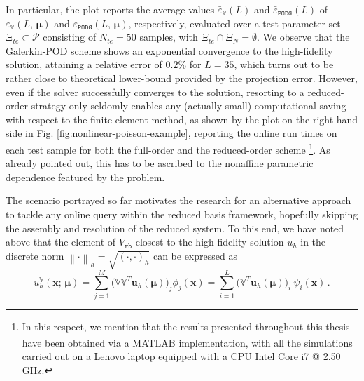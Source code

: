 \documentclass[12pt, a4paper, twoside, openright, notitlepage]{report}
\numberwithin{equation}{chapter}
\theoremstyle{theorem}
\theoremstyle{definition}
\theoremstyle{remark}
\theoremstyle{proposition}
\numberwithin{figure}{chapter}
\newcommand{\norm}[1]{\left\lVert#1\right\rVert}
\newcommand{\bg}[1]{\boldsymbol{#1}}
\begin{document}
		In particular, the plot reports the average values $\bar{\varepsilon}_{\mathbb{V}}^{}(L)$ and $\bar{\varepsilon}_{\texttt{PODG}}^{}(L)$ of $\varepsilon_{\mathbb{V}}(L, \, \bg{\mu})$ and $\varepsilon_{\texttt{PODG}}(L, \, \bg{\mu})$, respectively, evaluated over a test parameter set $\Xi_{te} \subset \mathcal{P}$ consisting of $N_{te} = 50$ samples, with $\Xi_{te} \cap \Xi_N = \emptyset$. We observe that the Galerkin-POD scheme shows an exponential convergence to the high-fidelity solution, attaining a relative error of $0.2 \%$ for $L = 35$, which turns out to be rather close to theoretical lower-bound provided by the projection error. However, even if the solver successfully converges to the solution, resorting to a reduced-order strategy only seldomly enables any (actually small) computational saving with respect to the finite element method, as shown by the plot on the right-hand side in Fig. \ref{fig:nonlinear-poisson-example}, reporting the online run times on each test sample for both the full-order and the reduced-order scheme \footnote{In this respect, we mention that the results presented throughout this thesis have been obtained via a MATLAB\textsuperscript{\textregistered} implementation, with all the simulations carried out on a Lenovo laptop equipped with a CPU Intel Core i7 @ 2.50 GHz.}. As already pointed out, this has to be ascribed to the nonaffine parametric dependence featured by the problem. 
										
		\vspace*{0.15cm}
									
		The scenario portrayed so far motivates the research for an alternative approach to tackle any online query within the reduced basis framework, hopefully skipping the assembly and resolution of the reduced system. To this end, we have noted above that the element of $V_{\texttt{rb}}$ closest to the high-fidelity solution $u_h$ in the discrete norm $\norm{\cdot}_h = \sqrt{(\cdot,\cdot)_h}$ can be expressed as
		\begin{equation}
			\label{eq:high-fidelity-projected}
			u^{\mathbb{V}}_h(\bg{x}; \, \bg{\mu}) = \sum_{j = 1}^M \big( \mathbb{V} \mathbb{V}^T \mathbf{u}_h(\bg{\mu}) \big)_j \phi_j(\bg{x}) = \sum_{i = 1}^L \big( \mathbb{V}^T \mathbf{u}_h(\bg{\mu}) \big)_i ~ \psi_i(\bg{x}) \, .
		\end{equation} 
		
		\vspace*{-0.5cm}
		
\end{document}

